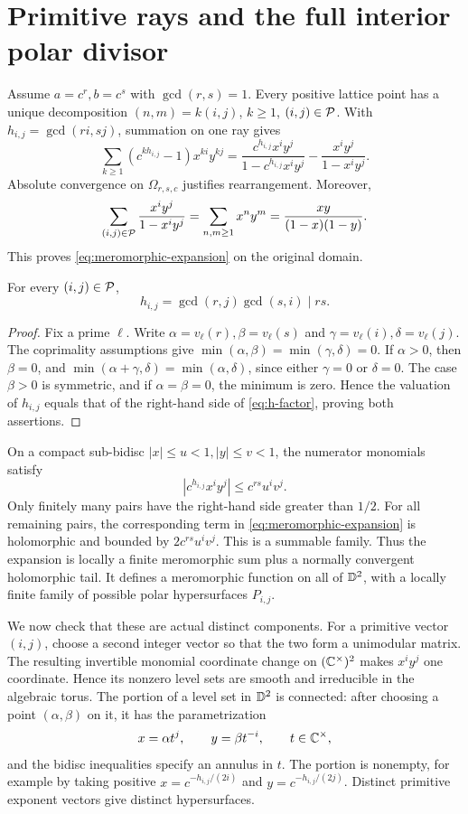 \section{Primitive rays and the full interior polar divisor}
\label{sec:poles}

Assume \(a=c^r,b=c^s\) with \(\gcd(r,s)=1\).
Every positive lattice point has a unique decomposition
\((n,m)=k(i,j)\), \(k\geq1\), \((i,j)\in\mathcal P\).
With \(h_{i,j}=\gcd(ri,sj)\), summation on one ray gives
\[
\sum_{k\geq1}(c^{k h_{i,j}}-1)x^{ki}y^{kj}
=\frac{c^{h_{i,j}}x^iy^j}{1-c^{h_{i,j}}x^iy^j}
-\frac{x^iy^j}{1-x^iy^j}.
\]
Absolute convergence on \(\Omega_{r,s,c}\) justifies rearrangement.
Moreover,
\[
\sum_{(i,j)\in\mathcal P}\frac{x^iy^j}{1-x^iy^j}
=\sum_{n,m\geq1}x^ny^m
=\frac{xy}{(1-x)(1-y)}.
\]
This proves \eqref{eq:meromorphic-expansion} on the original domain.

\begin{lemma}\label{lem:bounded-h}
For every \((i,j)\in\mathcal P\),
\begin{equation}\label{eq:h-factor}
h_{i,j}=\gcd(r,j)\gcd(s,i)\mid rs.
\end{equation}
\end{lemma}

\begin{proof}
Fix a prime \(\ell\). Write
\(\alpha=v_\ell(r),\beta=v_\ell(s)\) and
\(\gamma=v_\ell(i),\delta=v_\ell(j)\).
The coprimality assumptions give
\(\min(\alpha,\beta)=\min(\gamma,\delta)=0\).
If \(\alpha>0\), then \(\beta=0\), and
\(\min(\alpha+\gamma,\delta)=\min(\alpha,\delta)\), since either
\(\gamma=0\) or \(\delta=0\). The case \(\beta>0\) is symmetric,
and if \(\alpha=\beta=0\), the minimum is zero.
Hence the valuation of \(h_{i,j}\) equals that of the right-hand
side of \eqref{eq:h-factor}, proving both assertions.
\end{proof}

On a compact sub-bidisc \(|x|\leq u<1,|y|\leq v<1\), the numerator
monomials satisfy
\[
|c^{h_{i,j}}x^iy^j|\leq c^{rs}u^iv^j.
\]
Only finitely many pairs have the right-hand side greater than
\(1/2\). For all remaining pairs, the corresponding term in
\eqref{eq:meromorphic-expansion} is holomorphic and bounded by
\(2c^{rs}u^iv^j\). This is a summable family.
Thus the expansion is locally a finite meromorphic sum plus a
normally convergent holomorphic tail. It defines a meromorphic
function on all of \(\mathbb D^2\), with a locally finite family of possible
polar hypersurfaces \(P_{i,j}\).

We now check that these are actual distinct components.
For a primitive vector \((i,j)\), choose a second integer vector
so that the two form a unimodular matrix. The resulting invertible
monomial coordinate change on \((\mathbb C^\times)^2\) makes
\(x^iy^j\) one coordinate. Hence its nonzero level sets are smooth
and irreducible in the algebraic torus. The portion of a level set
in \(\mathbb D^2\) is connected: after choosing a point \((\alpha,\beta)\)
on it, it has the parametrization
\[
x=\alpha t^j,\qquad y=\beta t^{-i},\qquad t\in\mathbb C^\times,
\]
and the bidisc inequalities specify an annulus in \(t\).
The portion is nonempty, for example by taking positive
\(x=c^{-h_{i,j}/(2i)}\) and \(y=c^{-h_{i,j}/(2j)}\).
Distinct primitive exponent vectors give distinct hypersurfaces.

